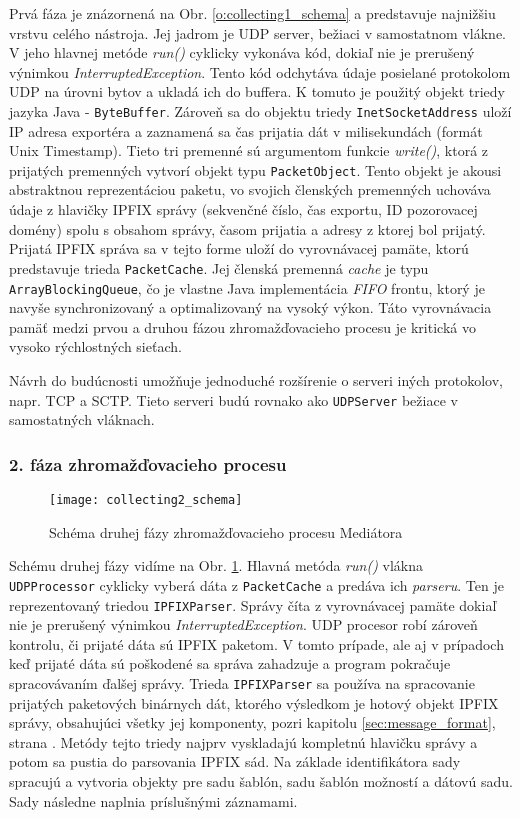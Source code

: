 Prvá fáza je znázornená na Obr. \ref{o:collecting1_schema} a predstavuje najnižšiu vrstvu celého 
nástroja. Jej jadrom je UDP server, bežiaci v samostatnom vlákne. V jeho hlavnej metóde \emph{run()}
cyklicky vykonáva kód, dokiaľ nie je prerušený výnimkou \emph{InterruptedException}.
Tento kód odchytáva údaje posielané protokolom UDP na úrovni bytov a ukladá ich do 
buffera. K tomuto je použitý objekt triedy jazyka Java - \verb|ByteBuffer|. Zároveň sa do objektu 
triedy \verb|InetSocketAddress| uloží IP adresa exportéra a zaznamená sa čas prijatia dát v 
milisekundách (formát Unix Timestamp). Tieto tri premenné sú argumentom funkcie \emph{write()}, 
ktorá z prijatých premenných vytvorí objekt typu \verb|PacketObject|. Tento objekt je akousi
abstraktnou reprezentáciou paketu, vo svojich členských premenných uchováva údaje z hlavičky
IPFIX správy (sekvenčné číslo, čas exportu, ID pozorovacej domény) spolu s obsahom správy, časom 
prijatia a adresy z ktorej bol prijatý. Prijatá IPFIX správa sa v tejto forme uloží do vyrovnávacej 
pamäte, ktorú predstavuje trieda \verb|PacketCache|. Jej členská 
premenná \emph{cache} je typu \verb|ArrayBlockingQueue|, čo je vlastne Java implementácia \emph{FIFO}
frontu, ktorý je navyše synchronizovaný a optimalizovaný na vysoký výkon. Táto vyrovnávacia pamäť 
medzi prvou a druhou fázou zhromažďovacieho procesu je kritická vo vysoko rýchlostných sieťach. 

Návrh do budúcnosti umožňuje jednoduché rozšírenie o serveri iných protokolov, napr. TCP a SCTP. 
Tieto serveri budú rovnako ako \verb|UDPServer| bežiace v samostatných vláknach.

\subsubsection{2. fáza zhromažďovacieho procesu}

\begin{figure}[ht!]
\centering
\texttt{[image: collecting2\_schema]}
\caption{Schéma druhej fázy zhromažďovacieho procesu Mediátora}\label{o:collecting2_schema}
\end{figure}

Schému druhej fázy vidíme na Obr. \ref{o:collecting2_schema}. Hlavná metóda \emph{run()} vlákna 
\verb|UDPProcessor| cyklicky vyberá dáta z \verb|PacketCache| a predáva ich \emph{parseru}. 
Ten je reprezentovaný 
triedou \verb|IPFIXParser|. Správy číta z vyrovnávacej pamäte dokiaľ nie je prerušený výnimkou 
\emph{InterruptedException}.
UDP procesor robí zároveň kontrolu, či prijaté dáta sú IPFIX paketom. V tomto prípade, ale aj v prípadoch
keď prijaté dáta sú poškodené sa správa zahadzuje a program pokračuje spracovávaním ďalšej správy.
Trieda \verb|IPFIXParser| sa používa na spracovanie prijatých paketových binárnych dát, ktorého 
výsledkom je hotový objekt IPFIX správy, obsahujúci všetky jej komponenty, pozri kapitolu 
\ref{sec:message_format}, strana \pageref{sec:message_format}. Metódy tejto triedy najprv vyskladajú 
kompletnú hlavičku správy a potom sa pustia do parsovania IPFIX sád. Na základe identifikátora sady 
spracujú a vytvoria objekty pre sadu šablón, sadu šablón možností a dátovú sadu. Sady následne naplnia 
príslušnými záznamami. 

